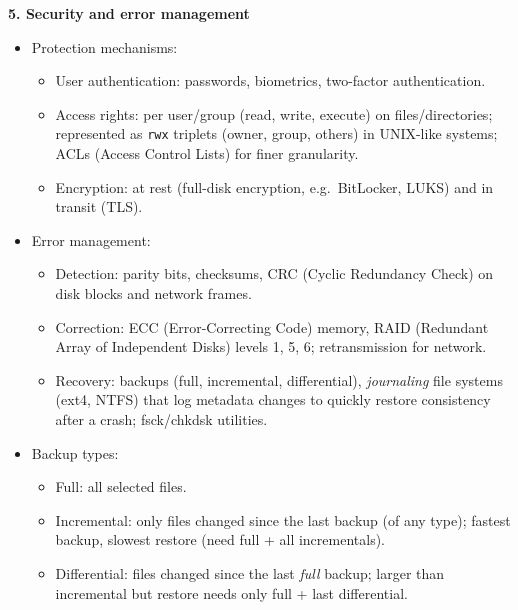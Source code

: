 \documentclass[11pt]{article}
\newcommand{\cle}[1]{{\popxbold\color{popdark}#1}}
\begin{document}
\begin{bilan}
\textbf{5. Security and error management}
\begin{itemize}
\item \cle{Protection mechanisms}:
  \begin{itemize}
  \item User authentication: passwords, biometrics, two-factor authentication.
  \item Access rights: per user/group (read, write, execute) on files/directories; represented as \texttt{rwx} triplets (owner, group, others) in UNIX-like systems; ACLs (Access Control Lists) for finer granularity.
  \item Encryption: at rest (full-disk encryption, e.g.\ BitLocker, LUKS) and in transit (TLS).
  \end{itemize}
\item \cle{Error management}:
  \begin{itemize}
  \item Detection: parity bits, checksums, CRC (Cyclic Redundancy Check) on disk blocks and network frames.
  \item Correction: ECC (Error-Correcting Code) memory, RAID (Redundant Array of Independent Disks) levels 1, 5, 6; retransmission for network.
  \item Recovery: backups (full, incremental, differential), \emph{journaling} file systems (ext4, NTFS) that log metadata changes to quickly restore consistency after a crash; fsck/chkdsk utilities.
  \end{itemize}
\item \cle{Backup types}:
  \begin{itemize}
  \item Full: all selected files.
  \item Incremental: only files changed since the last backup (of any type); fastest backup, slowest restore (need full + all incrementals).
  \item Differential: files changed since the last \emph{full} backup; larger than incremental but restore needs only full + last differential.
  \end{itemize}
\end{itemize}


\end{bilan}
\end{document}
